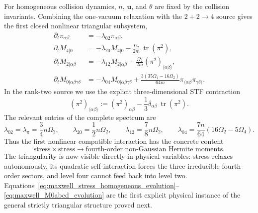 \documentclass[11pt,oneside]{article}
\numberwithin{equation}{section}
\theoremstyle{definition}
\begin{document}
For homogeneous collision dynamics, $n$, $\bm u$, and $\theta$ are fixed by the collision invariants.  Combining the one-vacuum relaxation with the $2+2\to4$ source gives the first closed nonlinear triangular subsystem,
\begin{align}
\partial_t\pi_{\alpha\beta}
&=-\lambda_{02}\pi_{\alpha\beta},
\label{eq:maxwell_stress_homogeneous_evolution}\\
\partial_t M_{4|0}
&=-\lambda_{20}M_{4|0}
-\frac{\Omega_2}{2m}\,\operatorname{tr}(\pi^2),
\label{eq:maxwell_M40_evolution}\\
\partial_t M_{2|\alpha\beta}
&=-\lambda_{12}M_{2|\alpha\beta}
-\frac{\Omega_2}{2m}
(\pi^2)_{\langle\alpha\beta\rangle},
\label{eq:maxwell_M2ab_evolution}\\
\partial_t M_{0|\alpha\beta\gamma\delta}
&=-\lambda_{04}M_{0|\alpha\beta\gamma\delta}
+\frac{3(35\Omega_4-16\Omega_2)}{64m}
\pi_{\langle\alpha\beta}\pi_{\gamma\delta\rangle}.
\label{eq:maxwell_M0abcd_evolution}
\end{align}
In the rank-two source we use the explicit three-dimensional STF contraction
\begin{equation}
(\pi^2)_{\langle\alpha\beta\rangle}
:=(\pi^2)_{\alpha\beta}
-\frac13\delta_{\alpha\beta}\,
\operatorname{tr}(\pi^2).
\label{eq:maxwell_pi_squared_STF}
\end{equation}
The relevant entries of the complete spectrum are
\begin{equation}
\lambda_{02}=\lambda_\pi=\frac34n\Omega_2,
\qquad
\lambda_{20}=\frac12n\Omega_2,
\qquad
\lambda_{12}=\frac78n\Omega_2,
\qquad
\lambda_{04}=\frac{7n}{64}(16\Omega_2-5\Omega_4).
\label{eq:maxwell_level4_rates}
\end{equation}
Thus the first nonlinear compatible interaction has the concrete content
\begin{equation}
\text{stress}\times\text{stress}
\longrightarrow
\text{fourth-order non-Gaussian Hermite moments}.
\label{eq:maxwell_stress_squared_to_fourth}
\end{equation}
The triangularity is now visible directly in physical variables: stress relaxes autonomously, its quadratic self-interaction forces the three irreducible fourth-order sectors, and level four cannot feed back into level two.  Equations~\eqref{eq:maxwell_stress_homogeneous_evolution}--\eqref{eq:maxwell_M0abcd_evolution} are the first explicit physical instance of the general strictly triangular structure proved next.


\end{document}
